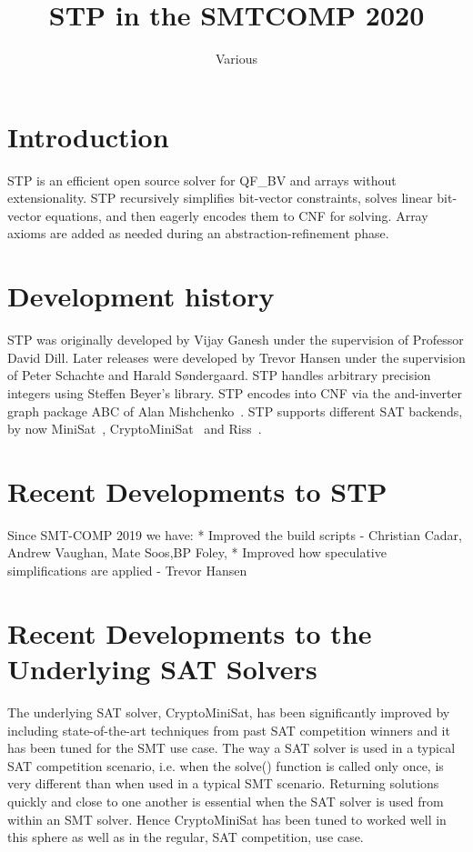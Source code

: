 \documentclass{easychair}
\begin{document}
\title{STP in the SMTCOMP 2020}
\author{Various}
\institute{}

\maketitle
\thispagestyle{empty}
\pagestyle{empty}

\section{Introduction}
STP\cite{Vijay:Thesis:2007} is an efficient open source solver for QF\_BV and arrays without extensionality. STP recursively simplifies bit-vector constraints, solves linear bit-vector equations, and then eagerly encodes them to CNF for solving. Array axioms are added as needed during an abstraction-refinement phase.

\section{Development history}
STP was originally developed by Vijay Ganesh under the supervision of Professor David Dill. Later releases were developed by Trevor Hansen under the supervision of Peter Schachte and Harald Søndergaard. STP handles arbitrary precision integers using Steffen Beyer's library. STP encodes into CNF via the and-inverter graph package ABC of Alan Mishchenko~\cite{Brayton:2010:AAI:2144310.2144317}.
STP supports different SAT backends, by now MiniSat~\cite{MiniSat:github}, CryptoMiniSat~\cite{CMS:github} and Riss~\cite{Riss:github}.

\section{Recent Developments to STP}
Since SMT-COMP 2019 we have:
* Improved the build scripts - Christian Cadar, Andrew Vaughan, Mate Soos,BP Foley, 
* Improved how speculative simplifications are applied - Trevor Hansen


\section{Recent Developments to the Underlying SAT Solvers}
The underlying SAT solver, CryptoMiniSat, has been significantly improved by including state-of-the-art techniques from past SAT competition winners and it has been tuned for the SMT use case.
The way a SAT solver is used in a typical SAT competition scenario, i.e. when the solve() function is called only once, is very different than when used in a typical SMT scenario.
Returning solutions quickly and close to one another is essential when the SAT solver is used from within an SMT solver.
Hence CryptoMiniSat has been tuned to worked well in this sphere as well as in the regular, SAT competition, use case.
\end{document}
